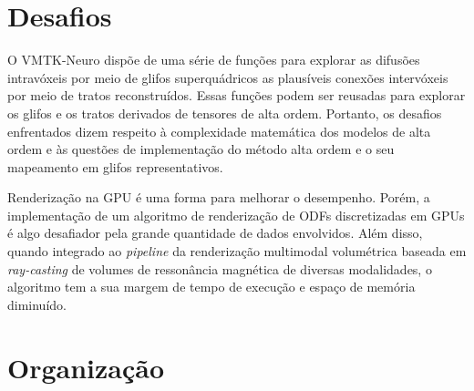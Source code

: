 \documentclass[
    12pt,                %
    oneside,            %
    a4paper,            %
    english,            %
    french,                %
    spanish,            %
    brazil                %
    ]{abntex2}
\begin{document}




\section{Desafios}
\label{sec::desafios}

O VMTK-Neuro dispõe de uma série de funções para explorar as difusões intravóxeis por meio de glifos superquádricos as plausíveis conexões intervóxeis por meio de tratos reconstruídos. 
Essas funções podem ser reusadas para explorar os glifos e os tratos derivados de tensores de alta ordem. 
Portanto, os desafios enfrentados dizem respeito à complexidade matemática dos modelos de alta ordem e às questões de implementação do método alta ordem e o seu mapeamento em glifos representativos.


Renderização na GPU é uma forma para melhorar o desempenho. Porém, a implementação de um algoritmo de renderização de ODFs discretizadas em GPUs é algo desafiador pela grande quantidade de dados envolvidos. 
Além disso, quando integrado ao \textit{pipeline} da renderização multimodal volumétrica baseada em \textit{ray-casting} de volumes de ressonância magnética de diversas modalidades, o algoritmo tem a sua margem de tempo de execução e espaço de memória diminuído.


\section{Organização}
\label{sec:intro_organizacao}
\end{document}

